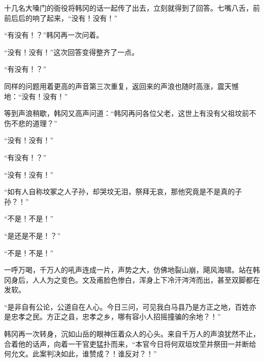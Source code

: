 十几名大嗓门的衙役将韩冈的话一起传了出去，立刻就得到了回答。七嘴八舌，前前后后的响了起来，“没有！没有！”

“有没有！？”韩冈再一次问着。

“没有！没有！”这次回答变得整齐了一点。

“有没有！？”

同样的问题用着更高的声音第三次重复，返回来的声浪也随时高涨，震天憾地：“没有！没有！”

等到声浪稍歇，韩冈又高声问道：“韩冈再问各位父老，这世上有没有父祖坟前不伤不悲的道理？”

“没有！没有！”

“有没有！？”

“没有！没有！”

“如有人自称坟冢之人子孙，却哭坟无泪，祭拜无哀，那他究竟是不是真的子孙？！”

“不是！不是！”

“是还是不是！？”

“不是！不是！”

一呼万喝，千万人的吼声连成一片，声势之大，仿佛地裂山崩，飓风海啸。站在韩冈身后，人人为之变色。文及甫脸色惨白，浑身上下冷汗涔涔而出，甚至双脚都在发软。

“是非自有公论，公道自在人心。今日三问，可见我白马县乃是方正之地，百姓亦是忠孝之民。方正之县，忠孝之乡，哪有容小人招摇撞骗的余地？！”

韩冈再一次转身，沉如山岳的眼神压着众人的心头。来自千万人的声浪犹然不止，合着他的话声，向着一干官吏猛扑而来，“本官今日将何双垣坟茔并祭田一并断给何允文。此案判决如此，谁赞成？！谁反对？！”

